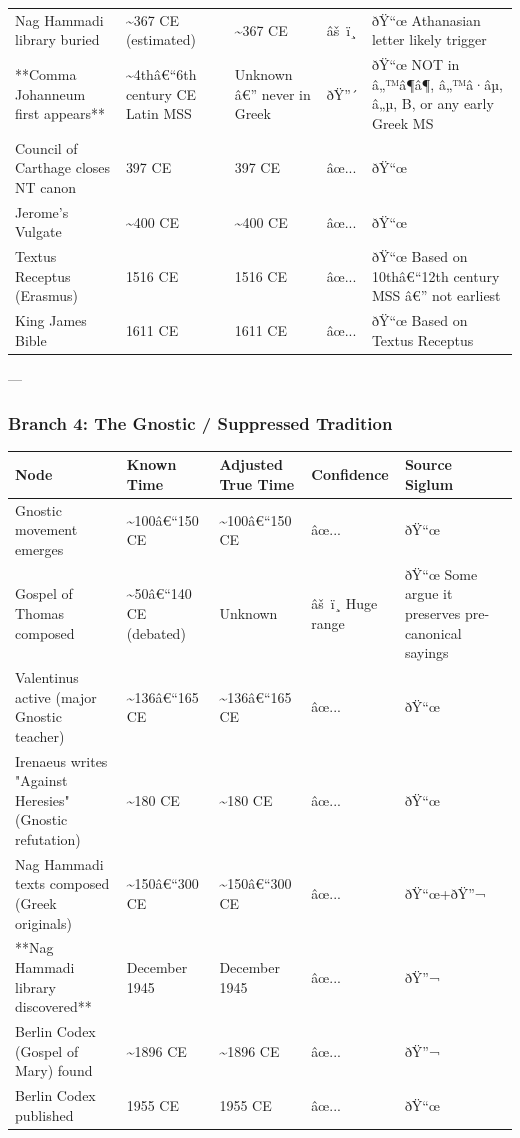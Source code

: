 \documentclass[aps,prd,11pt,onecolumn,superscriptaddress,nofootinbib,floatfix]{revtex4-2}
\begin{document}
\begin{table}[h!]
\begin{tabular}{p{3cm}p{3cm}p{3cm}p{3cm}p{3cm}}
Nag Hammadi library buried & \textasciitilde{}367 CE (estimated) & \textasciitilde{}367 CE & âš ï¸ & ðŸ``œ Athanasian letter likely trigger \\
**Comma Johanneum first appears** & \textasciitilde{}4thâ€``6th century CE Latin MSS & Unknown â€'' never in Greek & ðŸ''´ & ðŸ``œ NOT in â„™â¶â¶, â„™â·âµ, â„µ, B, or any early Greek MS \\
Council of Carthage closes NT canon & 397 CE & 397 CE & âœ... & ðŸ``œ \\
Jerome's Vulgate & \textasciitilde{}400 CE & \textasciitilde{}400 CE & âœ... & ðŸ``œ \\
Textus Receptus (Erasmus) & 1516 CE & 1516 CE & âœ... & ðŸ``œ Based on 10thâ€``12th century MSS â€'' not earliest \\
King James Bible & 1611 CE & 1611 CE & âœ... & ðŸ``œ Based on Textus Receptus \\
\hline
\end{tabular}
\end{table}



---


\subsubsection{Branch 4: The Gnostic / Suppressed Tradition}


\begin{table}[h!]
\centering
\begin{tabular}{p{3cm}p{3cm}p{3cm}p{3cm}p{3cm}}
\hline
Node & Known Time & Adjusted True Time & Confidence & Source Siglum \\
\hline
Gnostic movement emerges & \textasciitilde{}100â€``150 CE & \textasciitilde{}100â€``150 CE & âœ... & ðŸ``œ \\
Gospel of Thomas composed & \textasciitilde{}50â€``140 CE (debated) & Unknown & âš ï¸ Huge range & ðŸ``œ Some argue it preserves pre-canonical sayings \\
Valentinus active (major Gnostic teacher) & \textasciitilde{}136â€``165 CE & \textasciitilde{}136â€``165 CE & âœ... & ðŸ``œ \\
Irenaeus writes "Against Heresies" (Gnostic refutation) & \textasciitilde{}180 CE & \textasciitilde{}180 CE & âœ... & ðŸ``œ \\
Nag Hammadi texts composed (Greek originals) & \textasciitilde{}150â€``300 CE & \textasciitilde{}150â€``300 CE & âœ... & ðŸ``œ+ðŸ''¬ \\
**Nag Hammadi library discovered** & December 1945 & December 1945 & âœ... & ðŸ''¬ \\
Berlin Codex (Gospel of Mary) found & \textasciitilde{}1896 CE & \textasciitilde{}1896 CE & âœ... & ðŸ''¬ \\
Berlin Codex published & 1955 CE & 1955 CE & âœ... & ðŸ``œ \\
\hline
\end{tabular}
\end{table}
\end{document}
